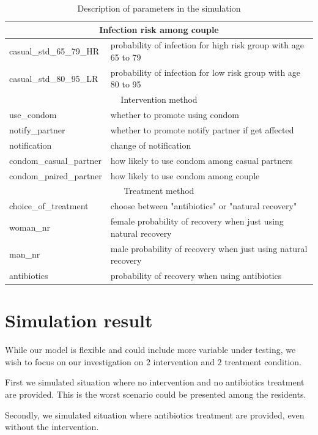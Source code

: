 \documentclass{article}
\begin{document}
\begin{normalsize}
\begin{table}[H]
\begin{tabular}{ |p{5cm}|p{7cm}| }
    		\hline
    		\multicolumn{2}{|c|}{Infection risk among couple} \\
    		\hline
    		casual\_std\_65\_79\_HR & probability of infection for high risk group with age 65 to 79\\
    		casual\_std\_80\_95\_LR & probability of infection for low risk group with age 80 to 95\\
    		\hline
    		\multicolumn{2}{|c|}{Intervention method} \\
    		\hline
    		use\_condom & whether to promote using condom\\
    		notify\_partner & whether to promote notify partner if get affected\\
    		notification & change of notification\\
    		condom\_casual\_partner & how likely to use condom among casual partners\\
    		condom\_paired\_partner & how likely to use condom among couple\\
    		\hline
    		\multicolumn{2}{|c|}{Treatment method} \\
    		\hline
    		choice\_of\_treatment & choose between "antibiotics" or "natural recovery"\\
    		woman\_nr & female probability of recovery when just using natural recovery\\
    		man\_nr & male probability of recovery when just using natural recovery\\
    		antibiotics & probability of recovery when using antibiotics\\
    		\hline
    	\end{tabular}
  
    	\caption{Description of parameters in the simulation}
    	\label{tab:parameter2}
   \end{table}

\section{Simulation result}
While our model is flexible and could include more variable under testing, we wish to focus on our investigation on $2$ intervention and $2$ treatment condition.

First we simulated situation where no intervention and no antibiotics treatment are provided. This is the worst scenario could be presented among the residents. 

Secondly, we simulated situation where antibiotics treatment are provided, even without the intervention.


\end{normalsize}
\end{document}
